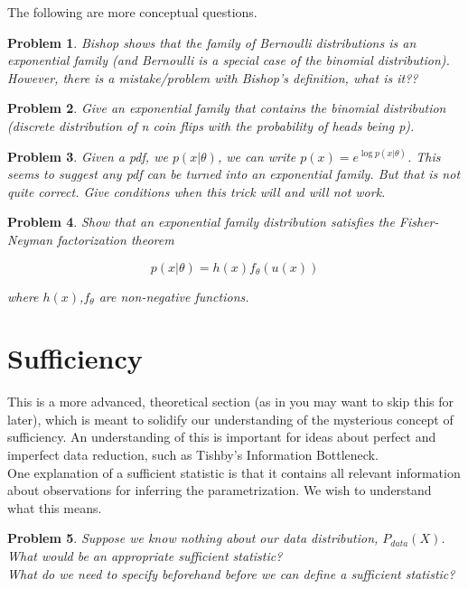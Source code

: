 \documentclass[a4paper]{article}
\newtheorem{problem}{Problem}[section]
\begin{document}
The following are more conceptual questions.

\begin{problem}
  Bishop shows that the family of Bernoulli distributions is an exponential family (and Bernoulli is a special case of the binomial distribution).  However, there is a mistake/problem with Bishop's definition, what is it??
\end{problem}

\begin{problem}
  Give an exponential family that contains the binomial distribution (discrete distribution of n coin flips with the probability of heads being p).
\end{problem}

\begin{problem}
  Given a pdf, we $p(x \vert \theta)$, we can write $p(x) = e^{\log p( x \vert \theta)}$.  This seems to suggest any pdf can be turned into an exponential family.  But that is not quite correct.  Give conditions when this trick will and will not work.
\end{problem}

\begin{problem}
Show that an exponential family distribution satisfies the Fisher-Neyman factorization theorem

\begin{equation}
  p(x \vert \theta) = h(x) f_\theta( u(x) )
  \label{}
\end{equation}

where $h(x)$,$f_\theta$ are non-negative functions.

\end{problem}


\section{Sufficiency} 

This is a more advanced, theoretical section (as in you may want to skip this for later), which is meant to solidify our understanding of the mysterious concept of sufficiency.  An understanding of this is important for ideas about perfect and imperfect data reduction, such as Tishby's Information Bottleneck. \\


One explanation of a sufficient statistic is that it contains all relevant information about observations for inferring the parametrization.  We wish to understand what this means.

\begin{problem}
Suppose we know nothing about our data distribution, $P_{data}(X)$.  What would be an appropriate sufficient statistic?  \\
What do we need to specify beforehand before we can define a sufficient statistic?  
\end{problem}
\end{document}
